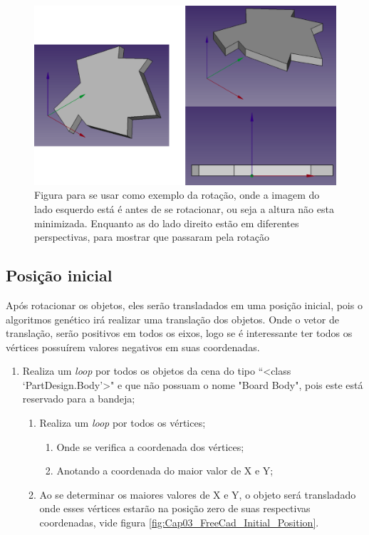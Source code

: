 \begin{figure}[H]
    \centering
    \includegraphics[scale=0.4]{Capitulos/Cap03_figs/Rotation_Face.png}
    \caption{Figura para se usar como exemplo da rotação, onde a imagem do lado esquerdo está é antes de se rotacionar, ou seja a altura não esta minimizada. Enquanto as do lado direito estão em diferentes perspectivas, para mostrar que passaram pela rotação}
    \label{fig:Cap03_FreeCad_Rotation}
\end{figure}
\subsection{Posição inicial}\label{cap:methods:initial_pos}

Após rotacionar os objetos, eles serão transladados em uma posição inicial, pois o algoritmos genético irá realizar uma translação dos objetos. Onde o vetor de translação, serão positivos em todos os eixos, logo se é interessante ter todos os vértices possuírem valores negativos em suas coordenadas.

\begin{enumerate}
    \item Realiza um \textit{loop} por todos os objetos da cena do tipo ``<class `PartDesign.Body'>" e que não possuam o nome "Board Body", pois este está reservado para a bandeja;
    \begin{enumerate}
        \item Realiza um \textit{loop} por todos os vértices;
        \begin{enumerate}
            \item Onde se verifica a coordenada dos vértices;
            \item Anotando a coordenada do maior valor de X e Y;
        \end{enumerate}
        \item Ao se determinar os maiores valores de X e Y, o objeto será transladado onde esses vértices estarão na posição zero de suas respectivas coordenadas, vide figura \ref{fig:Cap03_FreeCad_Initial_Position}.
    \end{enumerate}
\end{enumerate}

